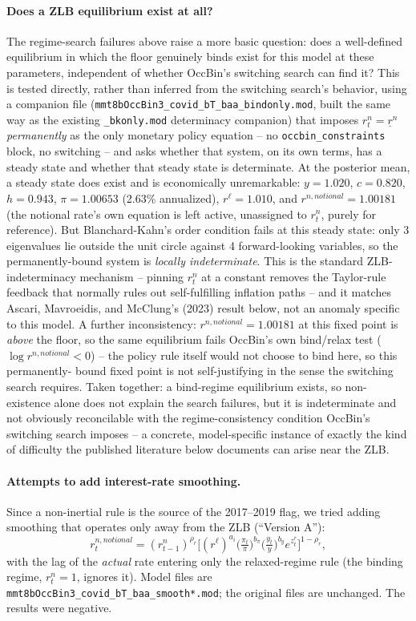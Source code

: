 \documentclass[11pt]{article}
\begin{document}
\paragraph{Does a ZLB equilibrium exist at all?} The regime-search
failures above raise a more basic question: does a well-defined
equilibrium in which the floor genuinely binds exist for this model at
these parameters, independent of whether OccBin's switching search can
find it? This is tested directly, rather than inferred from the
switching search's behavior, using a companion file
(\texttt{mmt8bOccBin3\_covid\_bT\_baa\_bindonly.mod}, built the same way
as the existing \texttt{\_bkonly.mod} determinacy companion) that imposes
$r^n_t=\underline{r}^n$ \emph{permanently} as the only monetary policy
equation -- no \texttt{occbin\_constraints} block, no switching -- and
asks whether that system, on its own terms, has a steady state and
whether that steady state is determinate. At the posterior mean, a steady
state does exist and is economically unremarkable: $y=1.020$, $c=0.820$,
$h=0.943$, $\pi=1.00653$ (2.63\% annualized), $r^\ell=1.010$, and
$r^{n,notional}=1.00181$ (the notional rate's own equation is left
active, unassigned to $r^n_t$, purely for reference). But
Blanchard-Kahn's order condition fails at this steady state: only 3
eigenvalues lie outside the unit circle against 4 forward-looking
variables, so the permanently-bound system is \emph{locally
indeterminate}. This is the standard ZLB-indeterminacy mechanism --
pinning $r^n_t$ at a constant removes the Taylor-rule feedback that
normally rules out self-fulfilling inflation paths -- and it matches
Ascari, Mavroeidis, and McClung's (2023) result below, not an anomaly
specific to this model. A further inconsistency: $r^{n,notional}=1.00181$
at this fixed point is \emph{above} the floor, so the same equilibrium
fails OccBin's own bind/relax test ($\log r^{n,notional}<0$) -- the
policy rule itself would not choose to bind here, so this permanently-
bound fixed point is not self-justifying in the sense the switching
search requires. Taken together: a bind-regime equilibrium exists, so
non-existence alone does not explain the search failures, but it is
indeterminate and not obviously reconcilable with the regime-consistency
condition OccBin's switching search imposes -- a concrete, model-specific
instance of exactly the kind of difficulty the published literature below
documents can arise near the ZLB.

\paragraph{Attempts to add interest-rate smoothing.}
Since a non-inertial rule is the source of the 2017--2019 flag, we tried
adding smoothing that operates only away from the ZLB (``Version A''):
\[
r^{n,notional}_t=(r^n_{t-1})^{\rho_r}\Big[(r^\ell)^{a_i}\big(\tfrac{\pi_t}{\pi}\big)^{b_\pi}
\big(\tfrac{y_t}{y}\big)^{b_y}e^{z^r_t}\Big]^{1-\rho_r},
\]
with the lag of the \emph{actual} rate entering only the relaxed-regime
rule (the binding regime, $r^n_t=1$, ignores it). Model files are
\texttt{mmt8bOccBin3\_covid\_bT\_baa\_smooth*.mod}; the original files are
unchanged. The results were negative.
\end{document}
